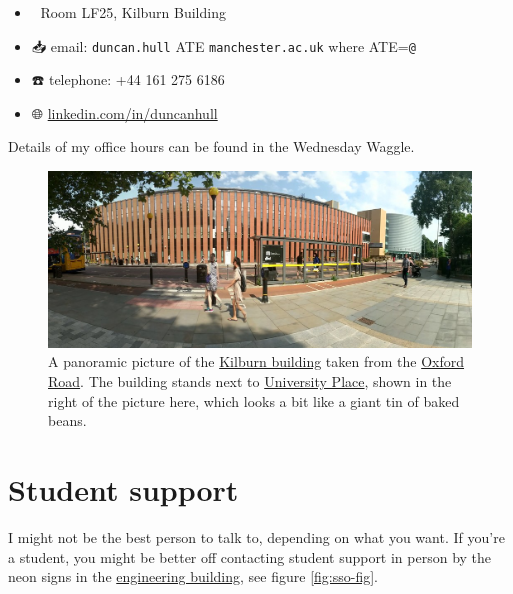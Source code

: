 \documentclass[
  12pt,
]{book}
\providecommand{\tightlist}{%
  \setlength{\itemsep}{0pt}\setlength{\parskip}{0pt}}
\begin{document}
\begin{itemize}
\tightlist
\item
  🏢 Room LF25, Kilburn Building
\item
  📥 email: \texttt{duncan.hull} ATE \texttt{manchester.ac.uk} where ATE=\texttt{@}
\item
  ☎️ telephone: +44 161 275 6186
\item
  🌐 \href{https://uk.linkedin.com/in/duncanhull}{linkedin.com/in/duncanhull}
\end{itemize}

Details of my office hours can be found in the Wednesday Waggle. 🐝

\begin{figure}

{\centering \includegraphics[width=1\linewidth]{images/kilburnarama} 

}

\caption{A panoramic picture of the \href{https://en.wikipedia.org/wiki/Kilburn_Building}{Kilburn building} taken from the \href{https://en.wikipedia.org/wiki/Wilmslow_Road}{Oxford Road}. The building stands next to \href{https://www.conference.manchester.ac.uk/venues/search/details/?property=10}{University Place}, shown in the right of the picture here, which looks a bit like a giant tin of baked beans.}\label{fig:kilburn-fig}
\end{figure}



\hypertarget{sso}{%
\section{Student support}\label{sso}}

I might not be the best person to talk to, depending on what you want. If you're a student, you might be better off contacting student support in person by the neon signs in the \href{https://www.mecd.manchester.ac.uk/}{engineering building}, see figure \ref{fig:sso-fig}.
\end{document}

